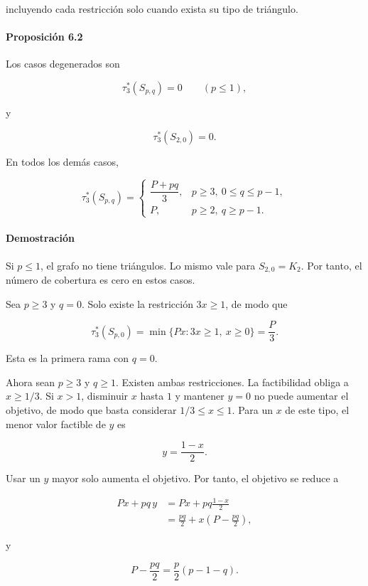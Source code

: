 \documentclass[
  spanish,
  11pt,
  a4paper,
]{article}
\begin{document}
incluyendo cada restricción solo cuando exista su tipo de triángulo.

\paragraph{Proposición 6.2}\label{proposiciuxf3n-6.2}

Los casos degenerados son

\[
\tau_3^*(S_{p,q})=0
\qquad
(p\le1),
\]

y

\[
\tau_3^*(S_{2,0})=0.
\]

En todos los demás casos,

\[
\boxed{
\tau_3^*(S_{p,q})
=
\begin{cases}
\dfrac{P+pq}{3},
& p\ge3,\ 0\le q\le p-1,\\[3mm]
P,
& p\ge2,\ q\ge p-1.
\end{cases}
}
\]

\paragraph{Demostración}\label{demostraciuxf3n-9}

Si \(p\le1\), el grafo no tiene triángulos. Lo mismo vale para \(S_{2,0}=K_2\). Por tanto, el número de cobertura es cero en estos casos.

Sea \(p\ge3\) y \(q=0\). Solo existe la restricción \(3x\ge1\), de modo que

\[
\tau_3^*(S_{p,0})
=
\min\{Px:3x\ge1,\ x\ge0\}
=
\frac P3.
\]

Esta es la primera rama con \(q=0\).

Ahora sean \(p\ge3\) y \(q\ge1\). Existen ambas restricciones. La factibilidad obliga a \(x\ge1/3\). Si \(x>1\), disminuir \(x\) hasta \(1\) y mantener \(y=0\) no puede aumentar el objetivo, de modo que basta considerar \(1/3\le x\le1\). Para un \(x\) de este tipo, el menor valor factible de \(y\) es

\[
y=\frac{1-x}{2}.
\]

Usar un \(y\) mayor solo aumenta el objetivo. Por tanto, el objetivo se reduce a

\[
\begin{aligned}
Px+pq\,y
&=
Px+pq\frac{1-x}{2}\\
&=
\frac{pq}{2}
+
x\left(P-\frac{pq}{2}\right),
\end{aligned}
\]

y

\[
P-\frac{pq}{2}
=
\frac p2(p-1-q).
\]
\end{document}
